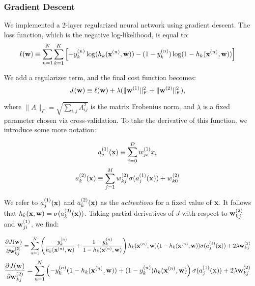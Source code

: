 \subsubsection{Gradient Descent}
We implemented a 2-layer regularized neural network using gradient descent.  The loss function, which is the negative log-likelihood, is equal to:
\begin{equation}
\ell(\boldsymbol{\mathbf{w}}) \equiv \sum_{n=1}^{N} \sum_{k=1}^{K} \left[ -y_k^{(n)} \log(h_{k}(\boldsymbol{\mathbf{x}}^{(n)}, \boldsymbol{\mathbf{w}})) - (1-y_k^{(n)}) \log(1 - h_{k}(\boldsymbol{\mathbf{x}}^{(n)}, \boldsymbol{\mathbf{w}}))\right]
\end{equation}

We add a regularizer term, and the final cost function becomes:
\begin{equation}
J(\boldsymbol{\mathbf{w}}) \equiv \ell(\boldsymbol{\mathbf{w}}) + \lambda(\|\boldsymbol{\mathbf{w}}^{(1)}\|^2_F + \|\boldsymbol{\mathbf{w}}^{(2)}\|^2_F),
\end{equation}

where $\|A\|_F = \sqrt{\sum_{i,j} A^2_{ij}}$ is the matrix Frobenius norm, and $\lambda$ is a fixed parameter chosen via cross-validation.  To take the derivative of this function, we introduce some more notation:

\begin{equation}
a^{(1)}_j(\boldsymbol{\mathbf{x}}) \equiv \sum_{i=0}^D w_{ji}^{(1)} x_i
\end{equation}
\begin{equation}
a^{(2)}_k(\boldsymbol{\mathbf{x}}) \equiv \sum_{j=1}^M w_{kj}^{(2)} \sigma(a^{(1)}_j(\boldsymbol{\mathbf{x}})) + w_{k0}^{(2)}
\end{equation}

We refer to $a^{(1)}_j(\boldsymbol{\mathbf{x}})$ and $a^{(2)}_k(\boldsymbol{\mathbf{x}})$ as the \emph{activations} for a fixed value of $\boldsymbol{\mathbf{x}}$.  It follows that $h_{k}(\boldsymbol{\mathbf{x}},\boldsymbol{\mathbf{w}}) = \sigma(a^{(2)}_k(\boldsymbol{\mathbf{x}}))$.  Taking partial derivatives of $J$ with respect to $\boldsymbol{\mathbf{w}}^{(2)}_{kj}$ and $\boldsymbol{\mathbf{w}}^{(1)}_{ji}$, we find:  

\begin{equation}
\frac{\partial J(\boldsymbol{\mathbf{w}})}{\partial \boldsymbol{\mathbf{w}}^{(2)}_{kj}} = \sum_{n=1}^{N} \left(\frac{-y_k^{(n)}}{h_k(\boldsymbol{\mathbf{x}}^{(n)},\boldsymbol{\mathbf{w}})} +  \frac{1-y_k^{(n)}}{1 - h_k(\boldsymbol{\mathbf{x}}^{(n)},\boldsymbol{\mathbf{w}})}\right) h_k(\boldsymbol{\mathbf{x}}^{(n)},\boldsymbol{\mathbf{w}}) (1 - h_k(\boldsymbol{\mathbf{x}}^{(n)},\boldsymbol{\mathbf{w}})) \sigma(a^{(1)}_j(\boldsymbol{\mathbf{x}})) + 2 \lambda \boldsymbol{\mathbf{w}}^{(2)}_{kj}
\end{equation}
\begin{equation}
\frac{\partial J(\boldsymbol{\mathbf{w}})}{\partial \boldsymbol{\mathbf{w}}^{(2)}_{kj}} = \sum_{n=1}^{N} \left(-y_k^{(n)}(1 - h_k(\boldsymbol{\mathbf{x}}^{(n)},\boldsymbol{\mathbf{w}})) + (1-y_k^{(n)})h_k(\boldsymbol{\mathbf{x}}^{(n)},\boldsymbol{\mathbf{w}}) \right) \sigma(a^{(1)}_j(\boldsymbol{\mathbf{x}})) + 2 \lambda \boldsymbol{\mathbf{w}}^{(2)}_{kj}
\end{equation}

